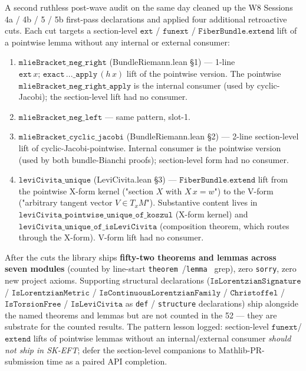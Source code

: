 \documentclass[twocolumn]{revtex4-2}
\begin{document}
A second ruthless post-wave audit on the same day cleaned up the
W8 Sessions 4a / 4b / 5 / 5b first-pass declarations and applied four
additional retroactive cuts. Each cut targets a section-level
$\texttt{ext}$ / $\texttt{funext}$ / $\texttt{FiberBundle.extend}$ lift
of a pointwise lemma without any internal or external consumer:
\begin{enumerate}
\item $\texttt{mlieBracket\_neg\_right}$ (BundleRiemann.lean §1) — 1-line
    $\texttt{ext}\,x;\, \texttt{exact}\,...\_\texttt{apply}\,(h\,x)$ lift
    of the pointwise version. The pointwise
    $\texttt{mlieBracket\_neg\_right\_apply}$ is the internal consumer
    (used by cyclic-Jacobi); the section-level lift had no consumer.
\item $\texttt{mlieBracket\_neg\_left}$ — same pattern, slot-1.
\item $\texttt{mlieBracket\_cyclic\_jacobi}$ (BundleRiemann.lean §2) —
    2-line section-level lift of cyclic-Jacobi-pointwise. Internal
    consumer is the pointwise version (used by both bundle-Bianchi
    proofs); section-level form had no consumer.
\item $\texttt{leviCivita\_unique}$ (LeviCivita.lean §3) —
    $\texttt{FiberBundle.extend}$ lift from the pointwise X-form
    kernel ("section $X$ with $X\,x = w$") to the V-form
    ("arbitrary tangent vector $V \in T_xM$"). Substantive content
    lives in $\texttt{leviCivita\_pointwise\_unique\_of\_koszul}$
    (X-form kernel) and $\texttt{leviCivita\_unique\_of\_isLeviCivita}$
    (composition theorem, which routes through the X-form). V-form
    lift had no consumer.
\end{enumerate}

After the cuts the library ships \textbf{fifty-two theorems and
lemmas across seven modules} (counted by line-start
\texttt{theorem~}/\texttt{lemma~} grep), zero \texttt{sorry}, zero new
project axioms. Supporting structural declarations
($\texttt{IsLorentzianSignature}$ / $\texttt{IsLorentzianMetric}$ /
$\texttt{IsContinuousLorentzianFamily}$ / $\texttt{Christoffel}$ /
$\texttt{IsTorsionFree}$ / $\texttt{IsLeviCivita}$ as
\texttt{def} / \texttt{structure} declarations) ship alongside the
named theorems and lemmas but are not counted in the 52 — they are
substrate for the counted results. The pattern
lesson logged: section-level $\texttt{funext}$/$\texttt{extend}$ lifts
of pointwise lemmas without an internal/external consumer
\emph{should not ship in SK-EFT}; defer the section-level companions
to Mathlib-PR-submission time as a paired API completion.
\end{document}
